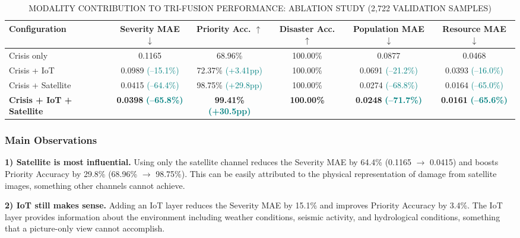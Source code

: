 \documentclass[journal]{IEEEtran}
\begin{document}
\begin{table}[!t]
\centering
\caption{MODALITY CONTRIBUTION TO TRI-FUSION PERFORMANCE: ABLATION STUDY (2,722 VALIDATION SAMPLES)}
\label{tab:ablation}
\begin{tabular}{lccccc}
\toprule
\textbf{Configuration} & \textbf{Severity MAE} $\downarrow$ & \textbf{Priority Acc.} $\uparrow$ & \textbf{Disaster Acc.} $\uparrow$ & \textbf{Population MAE} $\downarrow$ & \textbf{Resource MAE} $\downarrow$ \\
\midrule
Crisis only & 0.1165 & 68.96\% & 100.00\% & 0.0877 & 0.0468 \\
Crisis + IoT & 0.0989 \textcolor{teal}{\scriptsize(--15.1\%)} & 72.37\% \textcolor{teal}{\scriptsize(+3.41pp)} & 100.00\% & 0.0691 \textcolor{teal}{\scriptsize(--21.2\%)} & 0.0393 \textcolor{teal}{\scriptsize(--16.0\%)} \\
Crisis + Satellite & 0.0415 \textcolor{teal}{\scriptsize(--64.4\%)} & 98.75\% \textcolor{teal}{\scriptsize(+29.8pp)} & 100.00\% & 0.0274 \textcolor{teal}{\scriptsize(--68.8\%)} & 0.0164 \textcolor{teal}{\scriptsize(--65.0\%)} \\
\textbf{Crisis + IoT + Satellite} & \textbf{0.0398} \textcolor{teal}{\scriptsize\textbf{(--65.8\%)}} & \textbf{99.41\%} \textcolor{teal}{\scriptsize\textbf{(+30.5pp)}} & \textbf{100.00\%} & \textbf{0.0248} \textcolor{teal}{\scriptsize\textbf{(--71.7\%)}} & \textbf{0.0161} \textcolor{teal}{\scriptsize\textbf{(--65.6\%)}} \\
\bottomrule
\end{tabular}
\end{table}

\subsubsection{Main Observations}

\textbf{1) Satellite is most influential.} Using only the satellite channel reduces the Severity MAE by 64.4\% (0.1165 $\to$ 0.0415) and boosts Priority Accuracy by 29.8\% (68.96\% $\to$ 98.75\%). This can be easily attributed to the physical representation of damage from satellite images, something other channels cannot achieve.

\textbf{2) IoT still makes sense.} Adding an IoT layer reduces the Severity MAE by 15.1\% and improves Priority Accuracy by 3.4\%. The IoT layer provides information about the environment including weather conditions, seismic activity, and hydrological conditions, something that a picture-only view cannot accomplish.
\end{document}
